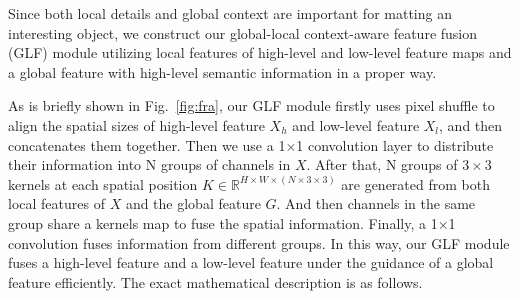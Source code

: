 \documentclass[10pt,twocolumn,letterpaper]{article}
\begin{document}
Since both local details and global context are important for matting an interesting object, we construct our global-local  context-aware feature fusion (GLF) module utilizing local features of high-level and low-level feature maps and a global feature with high-level semantic information in a proper way. 

As is briefly shown in Fig.~\ref{fig:fra}, our GLF module firstly uses pixel shuffle \cite{ps} to align the spatial sizes of high-level feature $X_h$ and low-level feature $X_l$, and then concatenates them together. Then we use a 1$\times$1 convolution layer to distribute their information into N groups of channels in $X$. After that, N groups of $3\times 3$ kernels at each spatial position $K \in \mathbb{R}^{H \times W\times (N\times 3 \times 3)}$ are generated from both local features of $X$ and the global feature $G$. And then channels in the same group share a kernels map to fuse the spatial information. Finally,   a 1$\times$1 convolution fuses information from different groups. In this way, our GLF module fuses a high-level feature and a low-level feature under the guidance of a global feature efficiently. The exact mathematical description is as follows.
\end{document}
